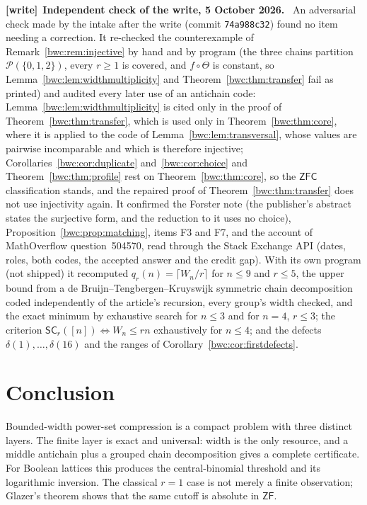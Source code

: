 \documentclass[11pt,letterpaper]{article}
\numberwithin{equation}{section}
\theoremstyle{plain}
\theoremstyle{definition}
\theoremstyle{remark}
\newcommand{\Pow}{\mathcal P}
\newcommand{\SC}{\mathsf{SC}}
\newcommand{\ZF}{\mathsf{ZF}}
\newcommand{\ZFC}{\mathsf{ZFC}}
\newcommand{\file}[1]{\nolinkurl{#1}}
\newenvironment{writenote}[1][]{\par\smallskip\begingroup\small
 \noindent\textbf{[write]}\if\relax\detokenize{#1}\relax\else~\textbf{#1.}\fi\ }%
 {\par\endgroup\smallskip}
\begin{document}
\begin{writenote}[Independent check of the write, 5 October 2026]
An adversarial check made by the intake after the write (commit
\file{74a988c32}) found no item needing a correction. It re-checked the
counterexample of Remark~\ref{bwc:rem:injective} by hand and by program
(the three chains partition $\Pow(\{0,1,2\})$, every $r\ge1$ is covered,
and $f\circ\Theta$ is constant, so Lemma~\ref{bwc:lem:widthmultiplicity}
and Theorem~\ref{bwc:thm:transfer} fail as printed) and audited every later use of an antichain code:
Lemma~\ref{bwc:lem:widthmultiplicity} is cited only in the proof of
Theorem~\ref{bwc:thm:transfer}, which is used only in
Theorem~\ref{bwc:thm:core}, where it is applied to the code of
Lemma~\ref{bwc:lem:transversal}, whose values are pairwise incomparable and
which is therefore injective; Corollaries~\ref{bwc:cor:duplicate}
and~\ref{bwc:cor:choice} and Theorem~\ref{bwc:thm:profile} rest on
Theorem~\ref{bwc:thm:core}, so the $\ZFC$ classification stands, and the
repaired proof of Theorem~\ref{bwc:thm:transfer} does not use injectivity
again. It confirmed the Forster note (the publisher's abstract states the
surjective form, and the reduction to it uses no choice),
Proposition~\ref{bwc:prop:matching}, items F3 and F7, and the account of
MathOverflow question~504570, read through the Stack Exchange API (dates,
roles, both codes, the accepted answer and the credit gap). With its own
program (not shipped) it recomputed $q_r(n)=\lceil W_n/r\rceil$ for $n\le9$
and $r\le5$, the upper bound from a de Bruijn--Tengbergen--Kruyswijk
symmetric chain decomposition coded independently of the article's
recursion, every group's width checked, and the exact minimum by
exhaustive search for $n\le3$ and for $n=4$, $r\le3$; the criterion
$\SC_r([n])\iff W_n\le rn$ exhaustively for $n\le4$; and the defects
$\delta(1),\dots,\delta(16)$ and the ranges of
Corollary~\ref{bwc:cor:firstdefects}.
\end{writenote}

\section{Conclusion}\label{bwc:sec:conclusion}

Bounded-width power-set compression is a compact problem with three distinct
layers.  The finite layer is exact and universal: width is the only resource,
and a middle antichain plus a grouped chain decomposition gives a complete
certificate.  For Boolean lattices this produces the central-binomial
threshold and its logarithmic inversion.  The classical $r=1$ case is not
merely a finite observation; Glazer's theorem shows that the same cutoff is
absolute in $\ZF$.
\end{document}
